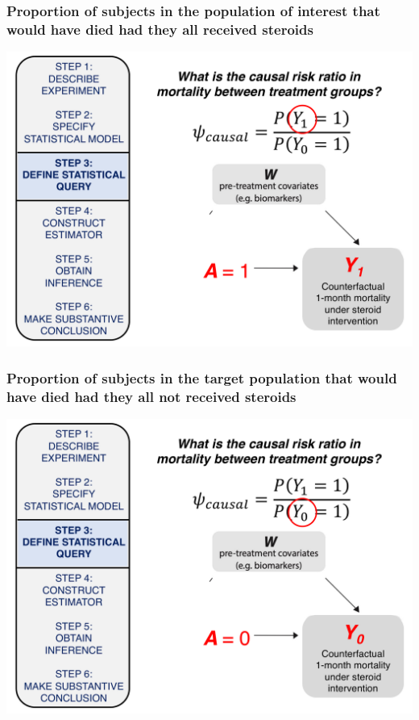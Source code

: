 \documentclass[t]{beamer}
\begin{document}
\begin{frame}
  \frametitle{Proportion of subjects in the population of interest that would have died had they all received steroids}
  \vspace{-20pt}
  \begin{center}
  \includegraphics[width = 1.05\textwidth]{figures/counterfactual_Y1.pdf}
  \end{center}
\end{frame}

\begin{frame}
  \frametitle{Proportion of subjects in the target population that would have died had they all not received steroids}
  \vspace{-20pt}
  \begin{center}
  \includegraphics[width = 1.05\textwidth]{figures/counterfactual_Y0.pdf}
  \end{center}
\end{frame}
\end{document}
